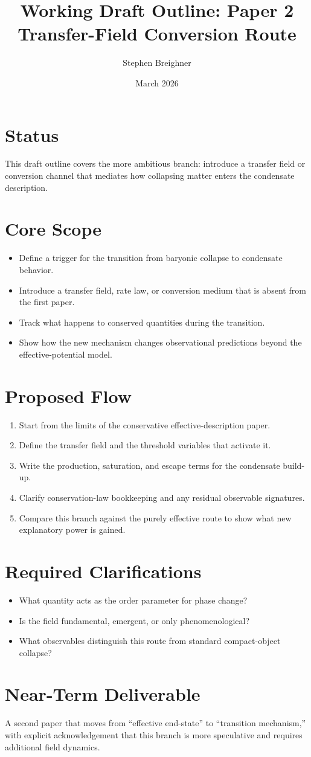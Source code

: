 \documentclass[11pt]{article}
\title{\textbf{Working Draft Outline: Paper 2 \\ Transfer-Field Conversion Route}}
\author{Stephen Breighner}
\date{March 2026}
\begin{document}
\maketitle

\section*{Status}
This draft outline covers the more ambitious branch: introduce a transfer field or conversion channel that mediates how collapsing matter enters the condensate description.

\section*{Core Scope}
\begin{itemize}[leftmargin=1.25em]
  \item Define a trigger for the transition from baryonic collapse to condensate behavior.
  \item Introduce a transfer field, rate law, or conversion medium that is absent from the first paper.
  \item Track what happens to conserved quantities during the transition.
  \item Show how the new mechanism changes observational predictions beyond the effective-potential model.
\end{itemize}

\section*{Proposed Flow}
\begin{enumerate}[leftmargin=1.4em]
  \item Start from the limits of the conservative effective-description paper.
  \item Define the transfer field and the threshold variables that activate it.
  \item Write the production, saturation, and escape terms for the condensate build-up.
  \item Clarify conservation-law bookkeeping and any residual observable signatures.
  \item Compare this branch against the purely effective route to show what new explanatory power is gained.
\end{enumerate}

\section*{Required Clarifications}
\begin{itemize}[leftmargin=1.25em]
  \item What quantity acts as the order parameter for phase change?
  \item Is the field fundamental, emergent, or only phenomenological?
  \item What observables distinguish this route from standard compact-object collapse?
\end{itemize}

\section*{Near-Term Deliverable}
A second paper that moves from ``effective end-state'' to ``transition mechanism,'' with explicit acknowledgement that this branch is more speculative and requires additional field dynamics.
\end{document}
